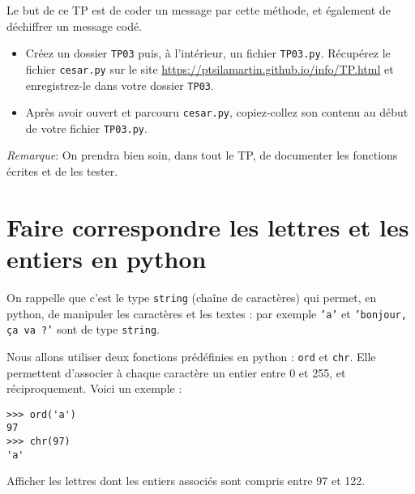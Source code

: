 Le but de ce TP est de coder un message par cette méthode, et également de déchiffrer un message codé. 
\bigskip
\begin{itemize}
\item[\textbullet] Créez un dossier \texttt{TP03} puis, à l'intérieur, un fichier \texttt{TP03.py}. 
Récupérez  le fichier \texttt{cesar.py} sur le site \url{https://ptsilamartin.github.io/info/TP.html}  et enregistrez-le dans votre dossier \texttt{TP03}.
\item[\textbullet] Après avoir ouvert et parcouru \texttt{cesar.py}, copiez-collez son contenu au début de votre fichier \texttt{TP03.py}.
\end{itemize}

\bigskip
%

\emph{Remarque}: On prendra bien soin, dans tout le TP, de documenter les fonctions écrites et de les tester.



\section*{Faire correspondre les lettres et les entiers en python}

On rappelle que c'est le type \texttt{string} (chaîne de caractères) qui permet, en python, de manipuler les caractères et les textes : par exemple \texttt{'a'} et \texttt{'bonjour, ça va ?'} sont de type \texttt{string}.

Nous allons utiliser deux fonctions prédéfinies en python : \texttt{ord} et \texttt{chr}. Elle permettent d'associer à chaque caractère un entier entre 0 et 255, et réciproquement.  Voici un exemple :
\begin{lstlisting}
>>> ord('a')
97
>>> chr(97)
'a'
\end{lstlisting}


\begin{question}
Afficher les lettres dont les entiers associés sont compris entre 97 et 122.
\end{question}


